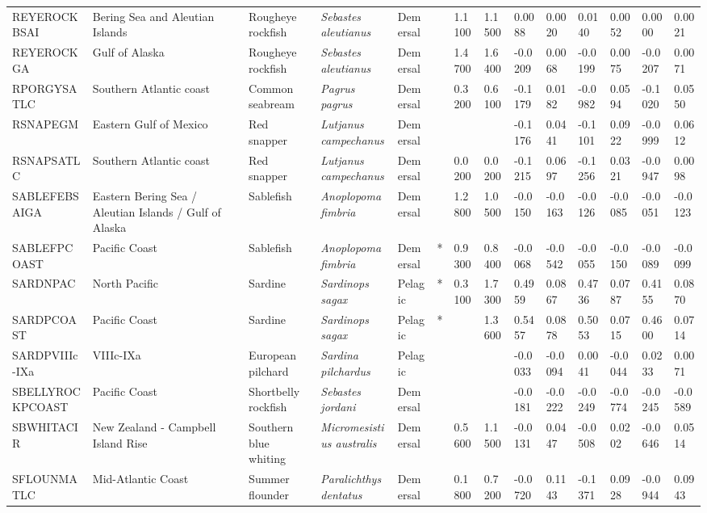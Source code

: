 \begin{longtable}{p{2.8cm}p{2cm}p{1.7cm}p{1.7cm}p{1cm}p{0.3cm}p{1cm}p{1cm}p{1cm}p{1cm}p{1cm}p{1cm}p{1cm}p{1cm}}
  REYEROCKBSAI & Bering Sea and Aleutian Islands & Rougheye rockfish & \textit{Sebastes aleutianus} & Demersal &   & 1.1100 & 1.1500 & 0.0088 & 0.0020 & 0.0140 & 0.0052 & 0.0000 & 0.0021 \\ 
  REYEROCKGA & Gulf of Alaska & Rougheye rockfish & \textit{Sebastes aleutianus} & Demersal &   & 1.4700 & 1.6400 & -0.0209 & 0.0068 & -0.0199 & 0.0075 & -0.0207 & 0.0071 \\ 
  RPORGYSATLC & Southern Atlantic coast & Common seabream & \textit{Pagrus pagrus} & Demersal &   & 0.3200 & 0.6100 & -0.1179 & 0.0182 & -0.0982 & 0.0594 & -0.1020 & 0.0550 \\ 
  RSNAPEGM & Eastern Gulf of Mexico & Red snapper & \textit{Lutjanus campechanus} & Demersal &  &  &  & -0.1176 & 0.0441 & -0.1101 & 0.0922 & -0.0999 & 0.0612 \\ 
  RSNAPSATLC & Southern Atlantic coast & Red snapper & \textit{Lutjanus campechanus} & Demersal &   & 0.0200 & 0.0200 & -0.1215 & 0.0697 & -0.1256 & 0.0321 & -0.0947 & 0.0098 \\ 
  SABLEFEBSAIGA & Eastern Bering Sea / Aleutian Islands / Gulf of Alaska & Sablefish & \textit{Anoplopoma fimbria} & Demersal &   & 1.2800 & 1.0500 & -0.0150 & -0.0163 & -0.0126 & -0.0085 & -0.0051 & -0.0123 \\ 
  SABLEFPCOAST & Pacific Coast & Sablefish & \textit{Anoplopoma fimbria} & Demersal & * & 0.9300 & 0.8400 & -0.0068 & -0.0542 & -0.0055 & -0.0150 & -0.0089 & -0.0099 \\ 
  SARDNPAC & North Pacific & Sardine & \textit{Sardinops sagax} & Pelagic & * & 0.3100 & 1.7300 & 0.4959 & 0.0867 & 0.4736 & 0.0787 & 0.4155 & 0.0870 \\ 
  SARDPCOAST & Pacific Coast & Sardine & \textit{Sardinops sagax} & Pelagic & * &  & 1.3600 & 0.5457 & 0.0878 & 0.5053 & 0.0715 & 0.4600 & 0.0714 \\ 
  SARDPVIIIc-IXa & VIIIc-IXa & European pilchard & \textit{Sardina pilchardus} & Pelagic &  &  &  & -0.0033 & -0.0094 & 0.0041 & -0.0044 & 0.0233 & 0.0071 \\ 
  SBELLYROCKPCOAST & Pacific Coast & Shortbelly rockfish & \textit{Sebastes jordani} & Demersal &  &  &  & -0.0181 & -0.0222 & -0.0249 & -0.0774 & -0.0245 & -0.0589 \\ 
  SBWHITACIR & New Zealand - Campbell Island Rise & Southern blue whiting & \textit{Micromesistius australis} & Demersal &   & 0.5600 & 1.1500 & -0.0131 & 0.0447 & -0.0508 & 0.0202 & -0.0646 & 0.0514 \\ 
  SFLOUNMATLC & Mid-Atlantic Coast & Summer flounder & \textit{Paralichthys dentatus} & Demersal &   & 0.1800 & 0.7200 & -0.0720 & 0.1143 & -0.1371 & 0.0928 & -0.0944 & 0.0943 \\ 

\end{longtable}
